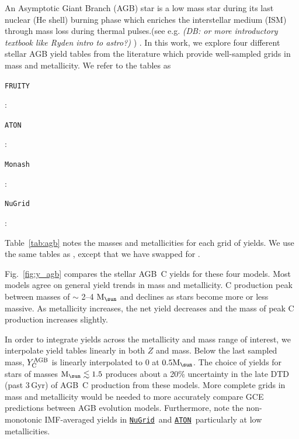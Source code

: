 \documentclass[fleqn,
usenatbib]{mnras}
\newcommand{\nugrid}{\texttt{\hyperlink{nugrid}{NuGrid}}}
\newcommand{\aton}{\texttt{\hyperlink{aton}{ATON}}}
\newcommand{\agb}{AGB}
\newcommand{\Mo}{ {\rm M}_{\sun}}
\newcommand{\dbnote}[1]{ {\color{Thistle} \textit{\small (DB: #1)}} }
\begin{document}
An Asymptotic Giant Branch (AGB) star is a low mass star during its last nuclear (He shell) burning phase which enriches the interstellar medium (ISM) through mass loss during thermal pulses.(see e.g. \citealt{PR2023} \dbnote{or more introductory textbook like Ryden intro to astro?}) . 
In this work, we explore four different stellar AGB yield tables from the literature which provide well-sampled grids in mass and metallicity. We refer to the tables as 
\begin{description}
    \item \hypertarget{fruity}{\texttt{FRUITY}}: \citet{cristallo+11, cristallo+15}
    \item \hypertarget{aton}{\texttt{ATON}}: \citet{ventura+13,ventura+14,ventura+18, ventura+20}
    \item \hypertarget{monash}{\texttt{Monash}}: \citet{KL16, karakas+18}
    \item \hypertarget{nugrid}{\texttt{NuGrid}}: \citet{pignatari+16, ritter+18, battino+19, battino+21}
\end{description}
Table~\ref{tab:agb} notes the masses and metallicities for each grid of yields.
We use the same tables as \citet{james+23}, except that we have swapped \citet{karakas10} for \citet{pignatari+16}.


Fig.~\ref{fig:y_agb} compares the stellar \agb\ C yields for these four models.
Most models agree on general yield trends in mass and metallicity.
C production peak between masses of $\sim$ 2--4 $\Mo$ and declines as stars become more or less massive. As metallicity increases, the net yield decreases and the mass of peak C production increases slightly.

In order to integrate yields across the metallicity and mass range of interest, we interpolate yield tables linearly in both $Z$ and mass. Below the last sampled mass, $Y_{\rm C}^{\rm AGB}$ is linearly interpolated to 0 at $0.5\Mo$. The choice of yields for stars of masses $\Mo \lesssim 1.5$ produces about a 20\% uncertainty in the late DTD (past 3\,Gyr) of \agb\ C production from these models. More complete grids in mass and metallicity would be needed to more accurately compare GCE predictions between AGB evolution models. Furthermore, note the non-monotonic IMF-averaged yields in \nugrid\ and \aton\ particularly at low metallicities.
\end{document}
